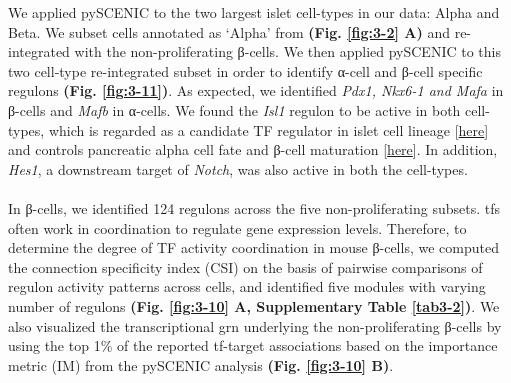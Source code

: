 We applied pySCENIC to the two largest islet cell-types in our data: Alpha and Beta. We subset cells annotated as `Alpha' from \textbf{(Fig. \ref{fig:3-2} A)} and re-integrated with the non-proliferating β-cells. We then applied pySCENIC to this two cell-type re-integrated subset in order to identify α-cell and β-cell specific regulons \textbf{(Fig. \ref{fig:3-11})}. As expected, we identified \textit{Pdx1, Nkx6-1 and Mafa} in β-cells and \textit{Mafb} in α-cells. We found the \textit{Isl1} regulon to be active in both cell-types, which is regarded as a candidate TF regulator in islet cell lineage [\href{https://www.ncbi.nlm.nih.gov/pmc/articles/PMC2551686/}{here}] and controls pancreatic alpha cell fate and β-cell maturation [\href{https://www.ncbi.nlm.nih.gov/pmc/articles/PMC9999528/}{here}]. In addition, \textit{Hes1}, a downstream target of \textit{Notch}, was also active in both the cell-types.\\\\
In β-cells, we identified 124 regulons across the five non-proliferating subsets. \glspl{tf} often work in coordination to regulate gene expression levels. Therefore, to determine the degree of TF activity coordination in mouse β-cells, we computed the connection specificity index (CSI) on the basis of pairwise comparisons of regulon activity patterns across cells, and identified five modules with varying number of regulons \textbf{(Fig. \ref{fig:3-10} A, Supplementary Table \ref{tab3-2})}. We also visualized the transcriptional \gls{grn} underlying the non-proliferating β-cells by using the top 1\% of the reported \gls{tf}-target associations based on the importance metric (IM) from the pySCENIC analysis \textbf{(Fig. \ref{fig:3-10} B)}.\\


